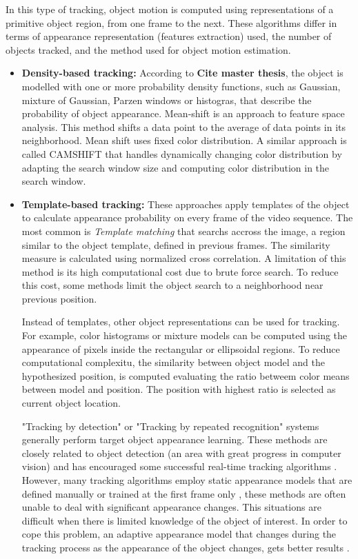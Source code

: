 In this type of tracking, object motion is computed using representations of a primitive object region, from one frame to the next. These algorithms differ in terms of appearance representation (features extraction) used, the number of objects tracked, and the method used for object motion estimation. 
\begin{itemize}
	\item \textbf{Density-based tracking:} According to \textbf{Cite master thesis}, the object is modelled with one or more probability density functions, such as Gaussian, mixture of Gaussian, Parzen windows or histogras, that describe the probability of object appearance. Mean-shift is an approach to feature space analysis. This method shifts a data point to the average of data points in its neighborhood. Mean shift uses fixed color distribution. A similar approach is called CAMSHIFT that handles dynamically changing color distribution by adapting the search window size and computing color distribution in the search window.

	\item \textbf{Template-based tracking:}  These approaches apply templates of the object to calculate appearance probability on every frame of the video sequence. The most common is \textit{Template matching} that searchs accross the image, a region similar to the object template, defined in previous frames. The similarity measure is calculated using normalized cross correlation. A limitation of this method is its high computational cost due to brute force search. To reduce this cost, some methods limit the object search to a neighborhood near previous position.

	Instead of templates, other object representations can be used for tracking. For example, color histograms or mixture models can be computed using the appearance of pixels inside the rectangular or ellipsoidal regions. To reduce computational complexitu, the similarity between object model and the hypothesized position, is computed evaluating the ratio betweem color means between model and position. The position with highest ratio is selected as current object location.

	"Tracking by detection" or "Tracking by repeated recognition" \cite{Mori2006} systems generally perform target object appearance learning. These methods are closely related to object detection (an area with great progress in computer vision) and has encouraged some successful real-time tracking algorithms \cite{Liu2007,Grabner2006}. However, many tracking algorithms employ static appearance models that are defined manually or trained at the first frame only \cite{Isard2001, Lepetit2006, Black1996, Comaniciu2000, Adam2006}, these methods are often unable to deal with significant appearance changes. This situations are difficult when there is limited knowledge of the object of interest. In order to cope this problem, an adaptive appearance model that changes during the tracking process as the appearance of the object changes, gets better results \cite{Ross2007,Matthews2004,Jepson2003}.


\end{itemize}
